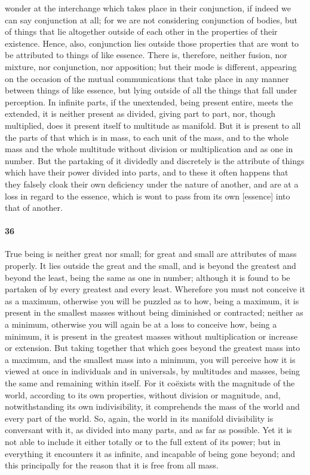 \documentclass[12pt]{article}
\begin{document}
wonder at the interchange which takes place in their conjunction, if indeed we can say conjunction at all; for we are not considering conjunction of bodies, but of things that lie altogether outside of each other in the properties of their existence. Hence, also, conjunction lies outside those properties that are wont to be attributed to things of like essence. There is, therefore, neither fusion, nor mixture, nor conjunction, nor apposition; but their mode is different, appearing on the occasion of the mutual communications that take place in any manner between things of like essence, but lying outside of all the things that fall under perception. In infinite parts, if the unextended, being present entire, meets the extended, it is neither present as divided, giving part to part, nor, though multiplied, does it present itself to multitude as manifold. But it is present to all the parts of that which is in mass, to each unit of the mass, and to the whole mass and the whole multitude without division or multiplication and as one in number. But the partaking of it dividedly and discretely is the attribute of things which have their power divided into parts, and to these it often happens that they falsely cloak their own deficiency under the nature of another, and are at a loss in regard to the essence, which is wont to pass from its own [essence] into that of another.

\paragraph{36} True being is neither great nor small; for great and small are attributes of mass properly. It lies outside the great and the small, and is beyond the greatest and beyond the least, being the same as one in number; although it is found to be partaken of by every greatest and every least. Wherefore you must not conceive it as a maximum, otherwise you will be puzzled as to how, being a maximum, it is present in the smallest masses without being diminished or contracted; neither as a minimum, otherwise you will again be at a loss to conceive how, being a minimum, it is present in the greatest masses without multiplication or increase or extension. But taking together that which goes beyond the greatest mass into a maximum, and the smallest mass into a minimum, you will perceive how it is viewed at once in individuals and in universals, by multitudes and masses, being the same and remaining within itself. For it co\"{e}xists with the magnitude of the world, according to its own properties, without division or magnitude, and, notwithstanding its own indivisibility, it comprehends the mass of the world and every part of the world. So, again, the world in its manifold divisibility is conversant with it, as divided into many parts, and as far as possible. Yet it is not able to include it either totally or to the full extent of its power; but in everything it encounters it as infinite, and incapable of being gone beyond; and this principally for the reason that it is free from all mass.
\end{document}
